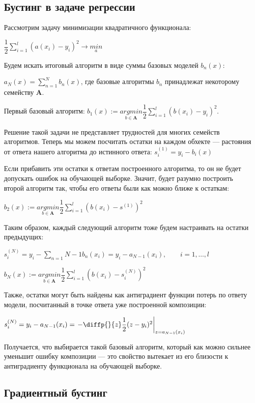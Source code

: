 \documentclass{article}
\theoremstyle{definition}
\theoremstyle{theorem}
\theoremstyle{remark}
\theoremstyle{theorem}
\theoremstyle{example}
\theoremstyle{theorem}
\theoremstyle{theorem}
\theoremstyle{theorem}
\theoremstyle{theorem}
\begin{document}
\subsection{Бустинг в задаче регрессии}

Рассмотрим задачу минимизации квадратичного функционала:

$\dfrac{1}{2}\sum_{i=1}^{l}(a(x_i)-y_i)^2 \rightarrow \underset{a}{min}$

Будем искать итоговый алгоритм в виде суммы базовых моделей $b_n(x)$:

$a_N(x) = \sum_{n=1}^{N}b_n(x)$, где базовые алгоритмы $b_n$ принадлежат некоторому семейству $\mathbf{A}$.

Первый базовый алгоритм: $b_1(x):= \underset{b\in\mathbf{A}}{argmin} \dfrac{1}{2}\sum_{i=1}^{l}(b(x_i)-y_i)^2$.

Решение такой задачи не представляет трудностей для многих семейств алгоритмов. Теперь мы можем посчитать остатки на каждом обхекте --- растояния от ответа нашего алгоритма до истинного ответа: $s^{(1)}_i = y_i - b_i(x)$

Если прибавить эти остатки к ответам построенного алгоритма, то он не будет допускать ошибок на обучающей выборке. Значит, будет разумно построить второй алгоритм так, чтобы его ответы были как можно ближе к остаткам:

$b_2(x) := \underset{b\in\mathbf{A}}{argmin} \dfrac{1}{2}\sum_{i=1}^{l}(b(x_i)-s^{(1)})^2$

Таким образом, каждый следующий алгоритм тоже будем настраивать на остатки предыдущих:

$s^{(N)}_i = y_i - \sum_{n=1}{N-1}b_n(x_i) = y_i - a_{N-1}(x_i),\qquad i=1,\ldots,l$

$b_N(x):= \underset{b\in\mathbf{A}}{argmin} \dfrac{1}{2}\sum_{i=1}^{l}(b(x_i)-s_i^{(N)})^2$

Также, остатки могут быть найдены как антиградиент функции потерь по ответу модели, посчитанный в точке ответа уже построенной композиции:

$s_i^{(N)} = y_i - a_{N-1}(x_i)= \left.- \diffp{}{z}\dfrac{1}{2}(z-y_i)^2\right|_{z=a_{N-1}(x_i)}$

Получается, что выбирается такой базовый алгоритм, который как можно сильнее уменьшит ошибку композиции — это свойство вытекает из его близости к антиградиенту функционала на обучающей выборке.

\subsection{Градиентный бустинг}\label{grad.b}
\end{document}
